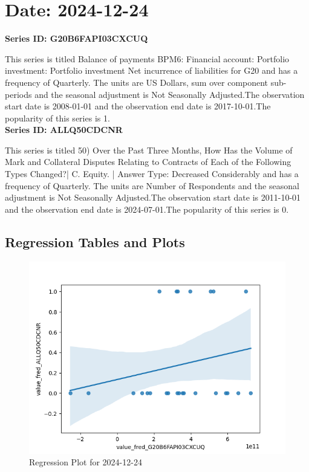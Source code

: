 \section{Date: 2024-12-24}
\noindent \textbf{Series ID: G20B6FAPI03CXCUQ} 

\noindent This series is titled Balance of payments BPM6: Financial account: Portfolio investment: Portfolio investment Net incurrence of liabilities for G20 and has a frequency of Quarterly. The units are US Dollars, sum over component sub-periods and the seasonal adjustment is Not Seasonally Adjusted.The observation start date is 2008-01-01 and the observation end date is 2017-10-01.The popularity of this series is 1. \\ 

\noindent \textbf{Series ID: ALLQ50CDCNR} 

\noindent This series is titled 50) Over the Past Three Months, How Has the Volume of Mark and Collateral Disputes Relating to Contracts of Each of the Following Types Changed?| C. Equity. | Answer Type: Decreased Considerably and has a frequency of Quarterly. The units are Number of Respondents and the seasonal adjustment is Not Seasonally Adjusted.The observation start date is 2011-10-01 and the observation end date is 2024-07-01.The popularity of this series is 0. \\ 

\subsection{Regression Tables and Plots}


\begin{figure}
\centering
\includegraphics[scale = 0.9]{plots/plot_2024-12-24.png}
\caption{Regression Plot for 2024-12-24}
\end{figure}
\newpage
